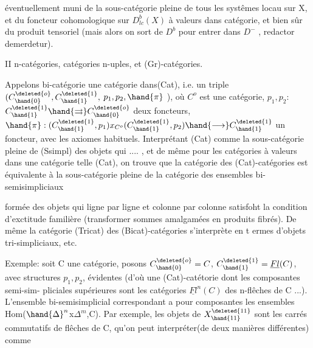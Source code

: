 éventuellement muni de la sous-catégorie pleine de tous les systêmes locau
sur X, et du foncteur cohomologique sur $D^b_{lc}(X)$ à valeurs dans 
catégorie, et bien sûr du produit tensoriel (mais alors on sort de $D^b$
pour entrer dans $D^-$ , redactor demerdetur).

II n-catégories, catégories n-uples, et (Gr)-catégories.

Appelons bi-catégorie une catégorie dans(Cat), i.e. un triple
$(C^{\deleted{o}}_{\hand{0}},C^{\deleted{1}}_{\hand{1}},$ $p_1,p_2,\hand{\pi}$ ), où $C^o$ est une catégorie, $p_1,p_2$: $C^{\deleted{1}}_{\hand{1}}\hand{\rightrightarrows}C^{\deleted{o}}_{\hand{0}}$ deux
foncteurs, $\hand{\pi}:(C^{\deleted{1}}_{\hand{1}},p_1)x_{C^o}(C^{\deleted{1}}_{\hand{1}},p_2)\hand{\longrightarrow}C^{\deleted{1}}_{\hand{1}}$ un foncteur, avec les axiomes
habituels. Interprétant (Cat) comme la sous-catégorie pleine de (Ssimpl)
des objets qui .... , et de même pour les catégories à valeurs dans une
catégorie telle (Cat), on trouve que la catégorie  des (Cat)-catégories
est équivalente à la sous-catégorie pleine de la catégorie des ensembles
bi-semisimpliciaux


formée des objets qui ligne par ligne et colonne par colonne satisfoht la
condition d'exctitude familière (transformer sommes amalgamées en produits
fibrés). De même la catégorie  (Tricat) des (Bicat)-catégories
s'interprète en t ermes d'objets tri-simpliciaux, etc.

Exemple: soit C une catégorie, posons $C^{\deleted{o}}_{\hand{0}}=C$, $C^{\deleted{1}}_{\hand{1}}=\underline{Fl}(C)$, avec structures
$p_1,p_2$, évidentes (d'où une (Cat)-catétorie dont les composantes semi-sim-%
pliciales supérieures sont les catégories $\underline{Fl}^n(C)$ des n-flêches de C ...).
L'ensemble bi-semisimplicial correspondant a pour composantes les ensembles
Hom($\hand{\Delta}^n$x$\Delta^m$,C). Par exemple, les objets de $X^{\deleted{11}}_{\hand{11}}$ sont les carrés commutatifs
de flêches de C, qu'on peut interpréter(de deux manières différentes) comme

